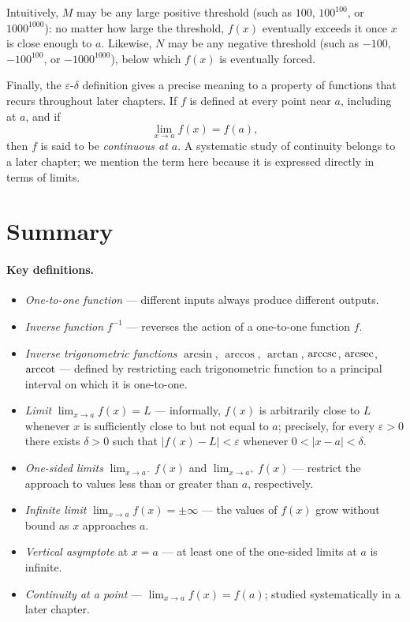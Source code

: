 Intuitively, \(M\) may be any large positive threshold (such as \(100\), \(100^{100}\), or \(1000^{1000}\)): no matter how large the threshold, \(f(x)\) eventually exceeds it once \(x\) is close enough to \(a\). Likewise, \(N\) may be any negative threshold (such as \(-100\), \(-100^{100}\), or \(-1000^{1000}\)), below which \(f(x)\) is eventually forced.

Finally, the \(\varepsilon\)-\(\delta\) definition gives a precise meaning to a property of functions that recurs throughout later chapters. If \(f\) is defined at every point near \(a\), including at \(a\), and if
\[
\lim_{x \to a} f(x) = f(a),
\]
then \(f\) is said to be \emph{continuous at \(a\)}. A systematic study of continuity belongs to a later chapter; we mention the term here because it is expressed directly in terms of limits.


\section*{Summary}

\paragraph{Key definitions.}
\begin{itemize}
    \item \emph{One-to-one function} --- different inputs always produce different outputs.
    \item \emph{Inverse function} \(f^{-1}\) --- reverses the action of a one-to-one function \(f\).
    \item \emph{Inverse trigonometric functions} \(\arcsin\), \(\arccos\), \(\arctan\), \(\operatorname{arccsc}\), \(\operatorname{arcsec}\), \(\operatorname{arccot}\) --- defined by restricting each trigonometric function to a principal interval on which it is one-to-one.
    \item \emph{Limit} \(\lim_{x \to a} f(x) = L\) --- informally, \(f(x)\) is arbitrarily close to \(L\) whenever \(x\) is sufficiently close to but not equal to \(a\); precisely, for every \(\varepsilon > 0\) there exists \(\delta > 0\) such that \(|f(x) - L| < \varepsilon\) whenever \(0 < |x - a| < \delta\).
    \item \emph{One-sided limits} \(\lim_{x \to a^{-}} f(x)\) and \(\lim_{x \to a^{+}} f(x)\) --- restrict the approach to values less than or greater than \(a\), respectively.
    \item \emph{Infinite limit} \(\lim_{x \to a} f(x) = \pm\infty\) --- the values of \(f(x)\) grow without bound as \(x\) approaches \(a\).
    \item \emph{Vertical asymptote} at \(x = a\) --- at least one of the one-sided limits at \(a\) is infinite.
    \item \emph{Continuity at a point} --- \(\lim_{x \to a} f(x) = f(a)\); studied systematically in a later chapter.
\end{itemize}

